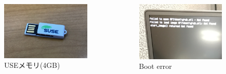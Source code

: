 \documentclass[aspectratio=169,11pt,hyperref={colorlinks=true}]{beamer}
\begin{document}
\begin{frame}
\begin{columns}[T]
\begin{column}{0.28\textwidth}
\begin{figure}
\begin{center}
        \end{center}
        \begin{center}
          \caption{USEメモリ(4GB)}
          \includegraphics[width=1.0\textwidth]{suse_usb.jpg}
        \end{center}
      \end{figure}
    \end{column}
    \begin{column}{0.28\textwidth}
      \begin{figure}
        \begin{center}
          \caption{Boot error}
          \includegraphics[width=1.0\textwidth]{boot.jpg}
        \end{center}
      \end{figure}
    \end{column}
  \end{columns}
\end{frame}
\end{document}
